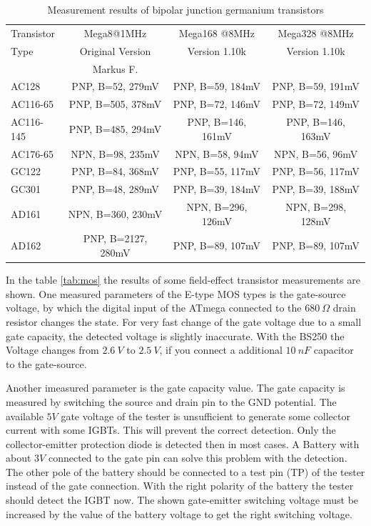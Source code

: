 \begin{table}[H]
  \begin{center}
    \begin{tabular}{| l | c | c | c |}
    \hline
 Transistor & Mega8@1MHz          & Mega168 @8MHz       & Mega328 @8MHz    \\
    Type    & Original Version    & Version 1.10k       & Version 1.10k  \\
            & Markus F.           &                     &        \\
    \hline
    \hline
AC128       & PNP, B=52, 279mV    & PNP, B=59, 184mV    & PNP, B=59, 191mV    \\
    \hline
AC116-65    & PNP, B=505, 378mV   & PNP, B=72, 146mV    & PNP, B=72, 149mV    \\
    \hline
AC116-145   & PNP, B=485, 294mV   & PNP, B=146, 161mV    & PNP, B=146, 163mV   \\
    \hline
AC176-65    & NPN, B=98, 235mV    & NPN, B=58, 94mV    & NPN, B=56, 96mV     \\
    \hline
GC122       & PNP, B=84, 368mV    & PNP, B=55, 117mV    & PNP, B=56, 117mV    \\
    \hline
GC301       & PNP, B=48, 289mV    & PNP, B=39, 184mV    & PNP, B=39, 188mV    \\
    \hline
AD161       & NPN, B=360, 230mV   & NPN, B=296, 126mV   & NPN, B=298, 128mV    \\
    \hline
AD162       & PNP, B=2127, 280mV  & PNP, B=89, 107mV    & PNP, B=89, 107mV    \\
    \hline
    \end{tabular}
  \end{center}
  \caption{Measurement results of bipolar junction germanium transistors}
  \label{tab:germanium}
\end{table}

In the table \ref{tab:mos} the results of some field-effect transistor measurements are shown.
One measured parameters of the E-type MOS types is the gate-source voltage, by which the
digital input of the ATmega connected to the \(680~\Omega\) drain resistor
changes the state.
For very fast change of the gate voltage due to a small gate capacity, the detected voltage is
slightly inaccurate.
With the BS250 the Voltage changes from \(2.6~V\) to \(2.5~V\), if you connect a additional
\(10~nF\) capacitor to the gate-source.

Another imeasured parameter is the gate capacity value.
The gate capacity is measured by switching the source and drain pin to the GND potential.
The available \(5V\) gate voltage of the tester is unsufficient to generate some collector current
with some IGBTs. This will prevent the correct detection.
Only the collector-emitter protection diode is detected then in most cases.
A Battery with about \(3V\) connected to the gate pin can solve this problem with the detection.
The other pole of the battery should be connected to a test pin (TP) of the tester instead of the gate connection.
With the right polarity of the battery the tester should detect the IGBT now.
The shown gate-emitter switching voltage must be increased by the value of the battery voltage
to get the right switching voltage.

